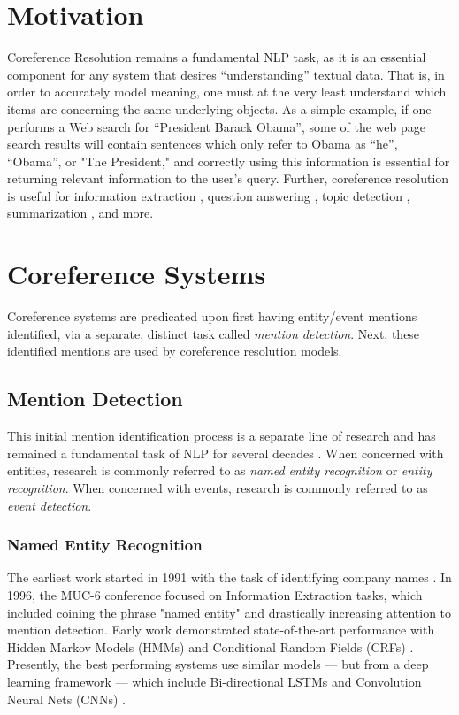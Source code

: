 \section{Motivation}
Coreference Resolution remains a fundamental NLP task, as it is an essential component for any system that desires ``understanding'' textual data.  That is, in order to accurately model meaning, one must at the very least understand which items are concerning the same underlying objects.  As a simple example, if one performs a Web search for ``President Barack Obama'', some of the web page search results will contain sentences which only refer to Obama as ``he'', ``Obama'', or "The President," and correctly using this information is essential for returning relevant information to the user's query.  Further, coreference resolution is useful for information extraction \cite{Humphreys:1997:ECI:1598819.1598830}, question answering \cite{Narayanan:2004:QAB:1220355.1220455}, topic detection \cite{Allan:1998}, summarization \cite{Daniel:2003}, and more.


\section{Coreference Systems}
Coreference systems are predicated upon first having entity/event mentions identified, via a separate, distinct task called \textit{mention detection}.  Next, these identified mentions are used by coreference resolution models.

\subsection{Mention Detection}
This initial mention identification process is a separate line of research and has remained a fundamental task of NLP for several decades \cite{ner-sekine2007}.  When concerned with entities, research is commonly referred to as \textit{named entity recognition} or \textit{entity recognition}. When concerned with events, research is commonly referred to as \textit{event detection}.

\subsubsection{Named Entity Recognition}
The earliest work started in 1991 with the task of identifying company names \cite{Rau91}.  In 1996, the MUC-6 conference \cite{Grishman:1996:MUC:992628.992709} focused on Information Extraction tasks, which included coining the phrase "named entity" and drastically increasing attention to mention detection.  Early work demonstrated state-of-the-art performance with Hidden Markov Models (HMMs) \cite{Bikel97nymble:a} and Conditional Random Fields (CRFs) \cite{McCallum:2003:ERN:1119176.1119206}.  Presently, the best performing systems use similar models --- but from a deep learning framework --- which include Bi-directional LSTMs \cite{Hochreiter:1997:LSM:1246443.1246450, DBLP:journals/tacl/ChiuN16} and Convolution Neural Nets (CNNs) \cite{ma-hovy:2016:P16-1}.

